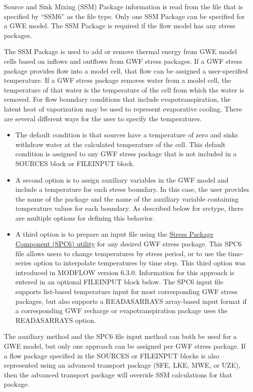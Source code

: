 Source and Sink Mixing (SSM) Package information is read from the file that is specified by ``SSM6'' as the file type.  Only one SSM Package can be specified for a GWE model.  The SSM Package is required if the flow model has any stress packages.

The SSM Package is used to add or remove thermal energy from GWE model cells based on inflows and outflows from GWF stress packages.  If a GWF stress package provides flow into a model cell, that flow can be assigned a user-specified temperature.  If a GWF stress package removes water from a model cell, the temperature of that water is the temperature of the cell from which the water is removed.  For flow boundary conditions that include evapotranspiration, the latent heat of vaporization may be used to represent evaporative cooling.  There are several different ways for the user to specify the temperatures.  

\begin{itemize}
\item The default condition is that sources have a temperature of zero and sinks withdraw water at the calculated temperature of the cell.  This default condition is assigned to any GWF stress package that is not included in a SOURCES block or FILEINPUT block.
\item A second option is to assign auxiliary variables in the GWF model and include a temperature for each stress boundary.  In this case, the user provides the name of the package and the name of the auxiliary variable containing temperature values for each boundary.  As described below for srctype, there are multiple options for defining this behavior.
\item A third option is to prepare an input file using the \hyperref[sec:spc]{Stress Package Component (SPC6) utility} for any desired GWF stress package.  This SPC6 file allows users to change temperatures by stress period, or to use the time-series option to interpolate temperatures by time step.  This third option was introduced in MODFLOW version 6.3.0.  Information for this approach is entered in an optional FILEINPUT block below.  The SPC6 input file supports list-based temperature input for most corresponding GWF stress packages, but also supports a READASARRAYS array-based input format if a corresponding GWF recharge or evapotranspiration package uses the READASARRAYS option.
\end{itemize}

\noindent The auxiliary method and the SPC6 file input method can both be used for a GWE model, but only one approach can be assigned per GWF stress package.   If a flow package specified in the SOURCES or FILEINPUT blocks is also represented using an advanced transport package (SFE, LKE, MWE, or UZE), then the advanced transport package will override SSM calculations for that package.

